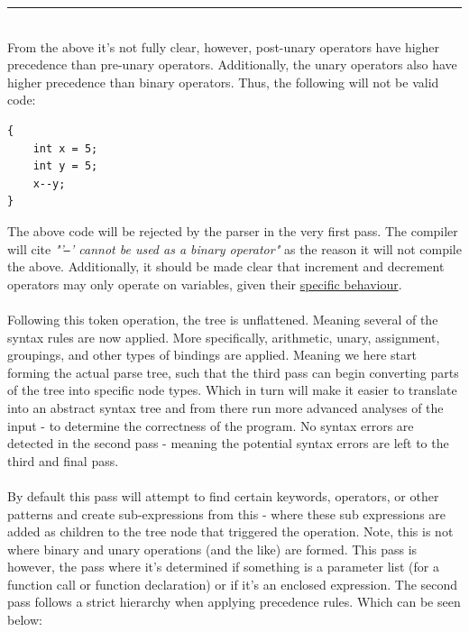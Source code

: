 \documentclass{article}
\begin{document}
\par\noindent\rule{\textwidth - 2pt}{0.2pt}\\
From the above it's not fully clear, however, post-unary operators have higher precedence than pre-unary operators. Additionally, the unary operators also have higher precedence than binary operators. Thus, the following will not be valid code:
\begin{lstlisting}
{
	int x = 5;
	int y = 5;
	x--y;
}
\end{lstlisting}
The above code will be rejected by the parser in the very first pass. The compiler will cite \textit{"'\texttt{--}' cannot be used as a binary operator"} as the reason it will not compile the above. Additionally, it should be made clear that increment and decrement operators may only operate on variables, given their \hyperref[sec:IncDecOp]{\textsf{specific behaviour}}.
\\\\
Following this token operation, the tree is unflattened. Meaning several of the syntax rules are now applied. More specifically, arithmetic, unary, assignment, groupings, and other types of bindings are applied. Meaning we here start forming the actual parse tree, such that the third pass can begin converting parts of the tree into specific node types. Which in turn will make it easier to translate into an abstract syntax tree and from there run more advanced analyses of the input - to determine the correctness of the program. No syntax errors are detected in the second pass - meaning the potential syntax errors are left to the third and final pass.
\\\\
By default this pass will attempt to find certain keywords, operators, or other patterns and create sub-expressions from this - where these sub expressions are added as children to the tree node that triggered the operation. Note, this is not where binary and unary operations (and the like) are formed. This pass is however, the pass where it's determined if something is a parameter list (for a function call or function declaration) or if it's an enclosed expression.
\newpage
The second pass follows a strict hierarchy when applying precedence rules. Which can be seen below:
\end{document}
